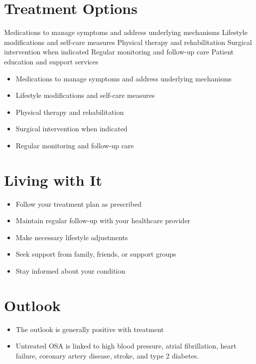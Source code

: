 \section{Treatment Options}
Medications to manage symptoms and address underlying mechanisms Lifestyle modifications and self-care measures Physical therapy and rehabilitation Surgical intervention when indicated Regular monitoring and follow-up care Patient education and support services

\begin{itemize}[noitemsep]
  \item Medications to manage symptoms and address underlying mechanisms
  \item Lifestyle modifications and self-care measures
  \item Physical therapy and rehabilitation
  \item Surgical intervention when indicated
  \item Regular monitoring and follow-up care
\end{itemize}
\section{Living with It}
\begin{itemize}[noitemsep]
  \item Follow your treatment plan as prescribed
  \item Maintain regular follow-up with your healthcare provider
  \item Make necessary lifestyle adjustments
  \item Seek support from family, friends, or support groups
  \item Stay informed about your condition
\end{itemize}
\section{Outlook}
\begin{itemize}[noitemsep]
  \item The outlook is generally positive with treatment
  \item Untreated OSA is linked to high blood pressure, atrial fibrillation, heart failure, coronary artery disease, stroke, and type 2 diabetes.
\end{itemize}
